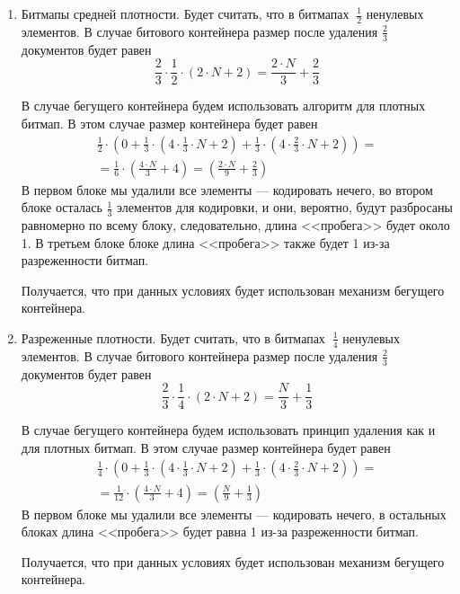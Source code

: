 \begin{enumerate}
    \item Битмапы средней плотности. Будет считать, что в битмапах $~ \frac{1}{2}$
    ненулевых элементов. В случае битового контейнера размер после удаления
    $\frac{2}{3}$ документов будет равен
    \begin{equation}
        \frac{2}{3} \cdot \frac{1}{2} \cdot \left(2\cdot N + 2\right) = \frac{2\cdot N}{3} + \frac{2}{3}
    \end{equation}

    В случае бегущего контейнера будем использовать алгоритм для плотных битмап.
    В этом случае размер контейнера будет равен
    \begin{multline}
        \frac{1}{2} \cdot \left(0 +
            \frac{1}{3} \cdot \left(4 \cdot \frac{1}{3} \cdot N + 2\right) +
            \frac{1}{3} \cdot \left(4 \cdot \frac{2}{3} \cdot N + 2\right)
            \right) =\\
            = \frac{1}{6} \cdot \left(\frac{4 \cdot N}{3} + 4\right)
            = \left(\frac{2 \cdot N}{9} + \frac{2}{3}\right)
    \end{multline}
    В первом блоке мы удалили все элементы — кодировать нечего, во втором блоке
    осталась $\frac{1}{3}$ элементов для кодировки, и они, вероятно, будут
    разбросаны равномерно по всему блоку, следовательно, длина <<пробега>> будет около 1.
    В третьем блоке блоке длина <<пробега>> также будет 1 из-за разреженности битмап.

    Получается, что при данных условиях будет использован механизм бегущего контейнера.

    \item Разреженные плотности. Будет считать, что в битмапах $~ \frac{1}{4}$
    ненулевых элементов. В случае битового контейнера размер после удаления
    $\frac{2}{3}$ документов будет равен
    \begin{equation}
        \frac{2}{3} \cdot \frac{1}{4} \cdot \left(2\cdot N + 2\right) = \frac{N}{3} + \frac{1}{3}
    \end{equation}

    В случае бегущего контейнера будем использовать принцип удаления как и для
    плотных битмап. В этом случае размер контейнера будет равен
    \begin{multline}
        \frac{1}{4} \cdot \left(0 +
            \frac{1}{3} \cdot \left(4 \cdot \frac{1}{3} \cdot N + 2\right) +
            \frac{1}{3} \cdot \left(4 \cdot \frac{2}{3} \cdot N + 2\right)
            \right) =\\
            = \frac{1}{12} \cdot \left(\frac{4 \cdot N}{3} + 4\right)
            = \left(\frac{N}{9} + \frac{1}{3}\right)
    \end{multline}
    В первом блоке мы удалили все элементы — кодировать нечего, в остальных блоках
    длина <<пробега>> будет равна 1 из-за разреженности битмап.

    Получается, что при данных условиях будет использован механизм бегущего контейнера.
\end{enumerate}

